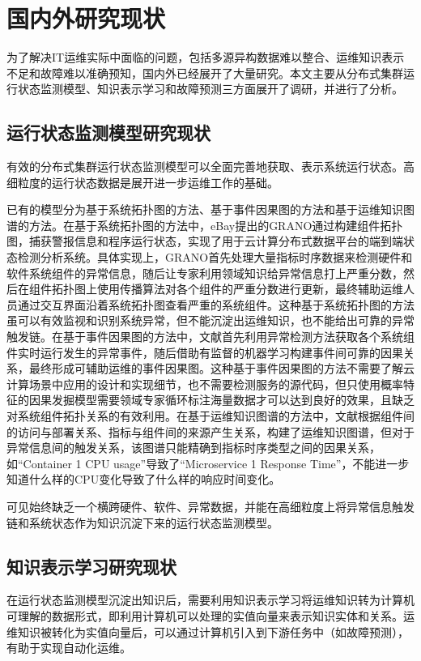 \section{国内外研究现状}
为了解决IT运维实际中面临的问题，包括多源异构数据难以整合、运维知识表示不足和故障难以准确预知，国内外已经展开了大量研究。本文主要从分布式集群运行状态监测模型、知识表示学习和故障预测三方面展开了调研，并进行了分析。
\subsection{运行状态监测模型研究现状}
有效的分布式集群运行状态监测模型可以全面完善地获取、表示系统运行状态。高细粒度的运行状态数据是展开进一步运维工作的基础。

已有的模型分为基于系统拓扑图的方法、基于事件因果图的方法和基于运维知识图谱的方法。在基于系统拓扑图的方法中，eBay提出的GRANO\cite{wang2019grano}通过构建组件拓扑图，捕获警报信息和程序运行状态，实现了用于云计算分布式数据平台的端到端状态检测分析系统。具体实现上，GRANO首先处理大量指标时序数据来检测硬件和软件系统组件的异常信息，随后让专家利用领域知识给异常信息打上严重分数，然后在组件拓扑图上使用传播算法对各个组件的严重分数进行更新，最终辅助运维人员通过交互界面沿着系统拓扑图查看严重的系统组件。这种基于系统拓扑图的方法虽可以有效监视和识别系统异常，但不能沉淀出运维知识，也不能给出可靠的异常触发链。在基于事件因果图的方法中，文献\parencite{nie2016mining-causality-graph}首先利用异常检测方法\cite{nguyen2011pal}获取各个系统组件实时运行发生的异常事件，随后借助有监督的机器学习\cite{breiman2001randomforest}构建事件间可靠的因果关系，最终形成可辅助运维的事件因果图。这种基于事件因果图的方法不需要了解云计算场景中应用的设计和实现细节，也不需要检测服务的源代码，但只使用概率特征的因果发掘模型需要领域专家循环标注海量数据才可以达到良好的效果，且缺乏对系统组件拓扑关系的有效利用。在基于运维知识图谱的方法中，文献\parencite{qiu2020causality-mining-knowledge-graph}根据组件间的访问与部署关系、指标与组件间的来源产生关系，构建了运维知识图谱，但对于异常信息间的触发关系，该图谱只能精确到指标时序类型之间的因果关系，如“Container 1 CPU usage”导致了“Microservice 1 Response Time”\cite{qiu2020causality-mining-knowledge-graph}，不能进一步知道什么样的CPU变化导致了什么样的响应时间变化。

可见始终缺乏一个横跨硬件、软件、异常数据，并能在高细粒度上将异常信息触发链和系统状态作为知识沉淀下来的运行状态监测模型。
\subsection{知识表示学习研究现状}\label{kge-research}
在运行状态监测模型沉淀出知识后，需要利用知识表示学习将运维知识转为计算机可理解的数据形式，即利用计算机可以处理的实值向量来表示知识实体和关系。运维知识被转化为实值向量后，可以通过计算机引入到下游任务中（如故障预测），有助于实现自动化运维。

